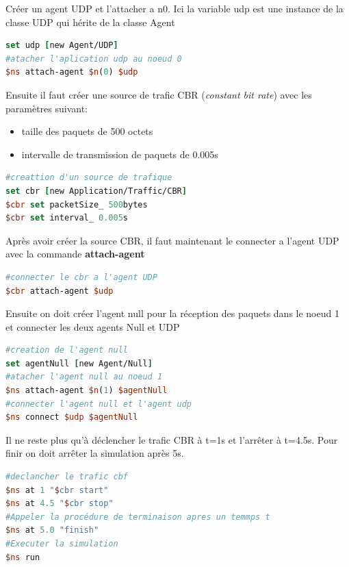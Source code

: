\documentclass[11pt]{article}
\begin{document}
Créer un agent UDP et l'attacher a n0. Ici la variable udp est une instance de la classe UDP qui hérite de la classe Agent

\begin{lstlisting}[language=tcl, numbers=none, framexleftmargin=0pt, 	framextopmargin=0pt, framexbottommargin=0pt]
set udp [new Agent/UDP]
#atacher l'aplication udp au noeud 0
$ns attach-agent $n(0) $udp 
\end{lstlisting}


Ensuite il faut créer une source de trafic CBR (\textit{constant bit rate}) avec les paramètres suivant:
\begin{itemize}
	\item taille des paquets de 500 octets
	\item intervalle de transmission de paquets de 0.005s
\end{itemize}

\begin{lstlisting}[language=tcl, numbers=none, framexleftmargin=0pt, 	framextopmargin=0pt, framexbottommargin=0pt]
#creattion d'un source de trafique
set cbr [new Application/Traffic/CBR]
$cbr set packetSize_ 500bytes
$cbr set interval_ 0.005s
\end{lstlisting}


Après avoir créer la source CBR, il faut maintenant le connecter a l'agent UDP avec la commande \textbf{attach-agent}
\begin{lstlisting}[language=tcl, numbers=none, framexleftmargin=0pt, 	framextopmargin=0pt, framexbottommargin=0pt]
#connecter le cbr a l'agent UDP
$cbr attach-agent $udp
\end{lstlisting}


Ensuite on doit créer l'agent null pour la réception des paquets dans le noeud 1 et connecter les deux agents Null et UDP
\begin{lstlisting}[language=tcl, numbers=none, framexleftmargin=0pt, 	framextopmargin=0pt, framexbottommargin=0pt]
#creation de l'agent null
set agentNull [new Agent/Null]
#atacher l'agent null au noeud 1
$ns attach-agent $n(1) $agentNull 
#connecter l'agent null et l'agent udp
$ns connect $udp $agentNull 
\end{lstlisting}

Il ne reste plus qu'à déclencher le trafic CBR à t=1s et l’arrêter à t=4.5s. Pour finir on doit arrêter la simulation après 5s. 
\begin{lstlisting}[language=tcl, numbers=none, framexleftmargin=0pt, 	framextopmargin=0pt, framexbottommargin=0pt]
#declancher le trafic cbf
$ns at 1 "$cbr start"
$ns at 4.5 "$cbr stop"
#Appeler la procédure de terminaison apres un temmps t 
$ns at 5.0 "finish"
#Executer la simulation
$ns run
\end{lstlisting}
\end{document}
